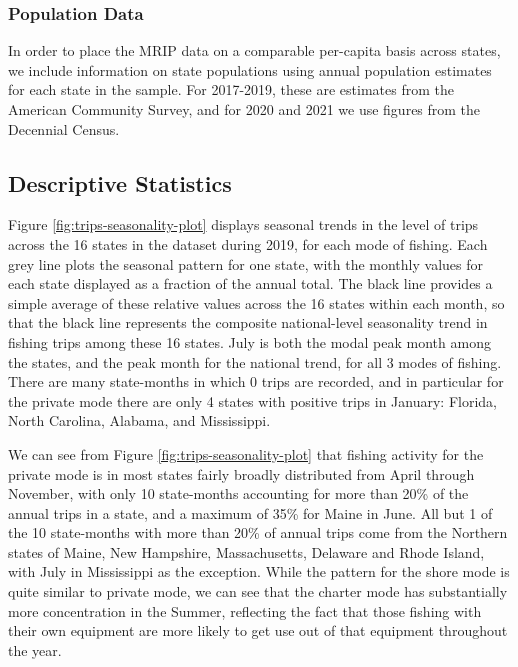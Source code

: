\documentclass[12pt]{article}
\begin{document}
\subsubsection{Population Data}

In order to place the MRIP data on a comparable per-capita basis across
states, we include information on state populations using annual
population estimates for each state in the sample. For 2017-2019, these
are estimates from the American Community Survey, and for 2020 and 2021
we use figures from the Decennial Census.


\subsection{Descriptive Statistics}



Figure \ref{fig:trips-seasonality-plot} displays seasonal trends in the
level of trips across the 16 states in the dataset during 2019, for each
mode of fishing. Each grey line plots the seasonal pattern for one
state, with the monthly values for each state displayed as a fraction of
the annual total. The black line provides a simple average of these
relative values across the 16 states within each month, so that the
black line represents the composite national-level seasonality trend in
fishing trips among these 16 states. July is both the modal peak month
among the states, and the peak month for the national trend, for all 3
modes of fishing. There are many state-months in which 0 trips are
recorded, and in particular for the private mode there are only 4 states
with positive trips in January: Florida, North Carolina, Alabama, and
Mississippi.

We can see from Figure \ref{fig:trips-seasonality-plot} that fishing
activity for the private mode is in most states fairly broadly
distributed from April through November, with only 10 state-months
accounting for more than 20\% of the annual trips in a state, and a
maximum of 35\% for Maine in June. All but 1 of the 10 state-months with
more than 20\% of annual trips come from the Northern states of Maine,
New Hampshire, Massachusetts, Delaware and Rhode Island, with July in
Mississippi as the exception. While the pattern for the shore mode is
quite similar to private mode, we can see that the charter mode has
substantially more concentration in the Summer, reflecting the fact that
those fishing with their own equipment are more likely to get use out of
that equipment throughout the year.
\end{document}
